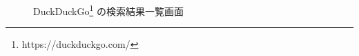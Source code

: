 \begin{figure}[htbp]
  \begin{minipage}{0.3\hsize}
    \begin{center}
    \end{center}
    \caption{Google\footnote{https://www.google.com/} の検索結果一覧画面}
  \end{minipage}
  \begin{minipage}{0.3\hsize}
    \begin{center}
    \end{center}
    \caption{Yahoo!\footnote{https://www.yahoo.co.jp/} の検索結果一覧画面}
  \end{minipage}
  \begin{minipage}{0.3\hsize}
    \begin{center}
    \end{center}
    \caption{DuckDuckGo\footnote{https://duckduckgo.com/} の検索結果一覧画面}
  \end{minipage}
\end{figure}

